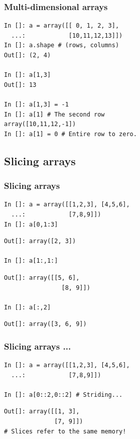 \documentclass[14pt,compress]{beamer}
\newcounter{time}
\newcommand{\inctime}[1]{\addtocounter{time}{#1}{\tiny \thetime\ m}}
\begin{document}
\begin{frame}[fragile]
  \frametitle{Multi-dimensional arrays}
\begin{lstlisting}
In []: a = array([[ 0, 1, 2, 3],
  ...:            [10,11,12,13]])
In []: a.shape # (rows, columns)
Out[]: (2, 4)

In []: a[1,3]
Out[]: 13

In []: a[1,3] = -1
In []: a[1] # The second row
array([10,11,12,-1])
In []: a[1] = 0 # Entire row to zero.
\end{lstlisting}
\inctime{10}
\end{frame}

\subsection{Slicing arrays}

\begin{frame}
  \frametitle{Slicing arrays}
  \vspace*{-0.2in}
\begin{lstlisting}
In []: a = array([[1,2,3], [4,5,6],
  ...:            [7,8,9]])
In []: a[0,1:3]
\end{lstlisting}
  \pause
  \vspace*{-0.1in}
\begin{lstlisting}
Out[]: array([2, 3])

In []: a[1:,1:]
\end{lstlisting}
  \pause
  \vspace*{-0.1in}
\begin{lstlisting}
Out[]: array([[5, 6],
                [8, 9]])

In []: a[:,2]
\end{lstlisting}
  \pause
  \vspace*{-0.1in}
\begin{lstlisting}
Out[]: array([3, 6, 9])
\end{lstlisting}
\end{frame}

\begin{frame}
  \frametitle{Slicing arrays ...}
  \vspace*{-0.2in}
\begin{lstlisting}
In []: a = array([[1,2,3], [4,5,6],
  ...:            [7,8,9]])

In []: a[0::2,0::2] # Striding...
\end{lstlisting}
  \pause
  \vspace*{-0.1in}
\begin{lstlisting}
Out[]: array([[1, 3],
              [7, 9]])
# Slices refer to the same memory!
\end{lstlisting}
\end{frame}
\end{document}
